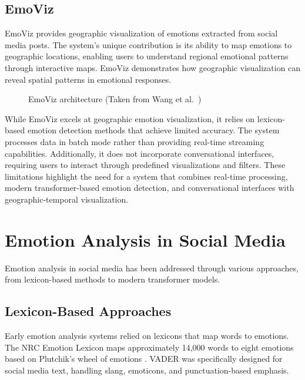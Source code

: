 \subsection{EmoViz}

EmoViz \cite{emoviz2014} provides geographic visualization of emotions extracted from social media posts. The system's unique contribution is its ability to map emotions to geographic locations, enabling users to understand regional emotional patterns through interactive maps. EmoViz demonstrates how geographic visualization can reveal spatial patterns in emotional responses.

\begin{figure}[htbp]
\centering

\caption{EmoViz architecture (Taken from Wang et al.~\cite{emoviz2014})}
\label{fig:emoviz}
\end{figure}

While EmoViz excels at geographic emotion visualization, it relies on lexicon-based emotion detection methods that achieve limited accuracy. The system processes data in batch mode rather than providing real-time streaming capabilities. Additionally, it does not incorporate conversational interfaces, requiring users to interact through predefined visualizations and filters. These limitations highlight the need for a system that combines real-time processing, modern transformer-based emotion detection, and conversational interfaces with geographic-temporal visualization.


\section{Emotion Analysis in Social Media}

Emotion analysis in social media has been addressed through various approaches, from lexicon-based methods to modern transformer models.

\subsection{Lexicon-Based Approaches}

Early emotion analysis systems relied on lexicons that map words to emotions. The NRC Emotion Lexicon \cite{mohammad2013nrc} maps approximately 14,000 words to eight emotions based on Plutchik's wheel of emotions \cite{plutchik1980emotion}. VADER \cite{hutto2014vader} was specifically designed for social media text, handling slang, emoticons, and punctuation-based emphasis.

